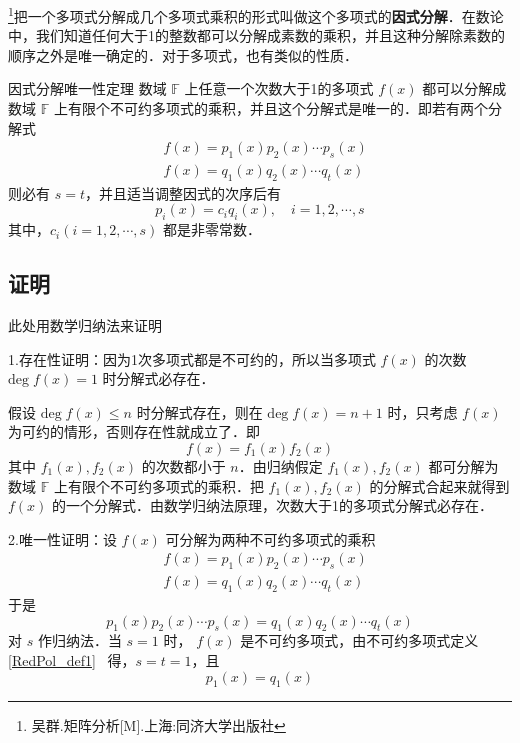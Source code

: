 
\footnote{吴群.矩阵分析[M].上海:同济大学出版社}把一个多项式分解成几个多项式乘积的形式叫做这个多项式的\textbf{因式分解}．在数论中，我们知道任何大于1的整数都可以分解成素数的乘积，并且这种分解除素数的顺序之外是唯一确定的．对于多项式，也有类似的性质．
\begin{theorem}{因式分解唯一性定理}
数域 $\mathbb{F}$ 上任意一个次数大于1的多项式 $f(x)$ 都可以分解成数域 $\mathbb{F}$ 上有限个不可约多项式的乘积，并且这个分解式是唯一的．即若有两个分解式
 \begin{equation}
 \begin{aligned}
 &f(x)=p_1(x)p_2(x)\cdots p_s(x)\\
 &f(x)=q_1(x)q_2(x)\cdots q_t(x)
 \end{aligned}
 \end{equation}
 则必有 $s=t$，并且适当调整因式的次序后有
 \begin{equation}
 p_i(x)=c_iq_i(x),\quad i=1,2,\cdots,s
 \end{equation}
 其中，$c_i(i=1,2,\cdots,s)$ 都是非零常数．
\end{theorem}
\subsection{证明}此处用数学归纳法来证明

1.存在性证明：因为1次多项式都是不可约的，所以当多项式 $f(x)$ 的次数 $\mathrm{deg}\;f(x)=1$ 时分解式必存在．

假设 $\mathrm{deg}\;f(x)\leq n$ 时分解式存在，则在 $\mathrm{deg}\;f(x)=n+1$ 时，只考虑 $f(x)$ 为可约的情形，否则存在性就成立了．即
\begin{equation}
f(x)=f_1(x)f_2(x)
\end{equation}
其中 $f_1(x),f_2(x)$ 的次数都小于 $n$．由归纳假定 $f_1(x),f_2(x)$ 都可分解为数域 $\mathbb{F}$ 上有限个不可约多项式的乘积．把 $f_1(x),f_2(x)$ 的分解式合起来就得到 $f(x)$ 的一个分解式．由数学归纳法原理，次数大于1的多项式分解式必存在．

 2.唯一性证明：设 $f(x)$ 可分解为两种不可约多项式的乘积
 \begin{equation}
 \begin{aligned}
 &f(x)=p_1(x)p_2(x)\cdots p_s(x)\\
 &f(x)=q_1(x)q_2(x)\cdots q_t(x)
 \end{aligned}
 \end{equation}
 于是
 \begin{equation}\label{UniFac_eq1}
 p_1(x)p_2(x)\cdots p_s(x)=q_1(x)q_2(x)\cdots q_t(x)
 \end{equation}
 对 $s$ 作归纳法．当 $s=1$ 时， $f(x)$ 是不可约多项式，由不可约多项式定义\autoref{RedPol_def1}~ 得，$s=t=1$，且
 \begin{equation}
 p_1(x)=q_1(x)
 \end{equation}
 
